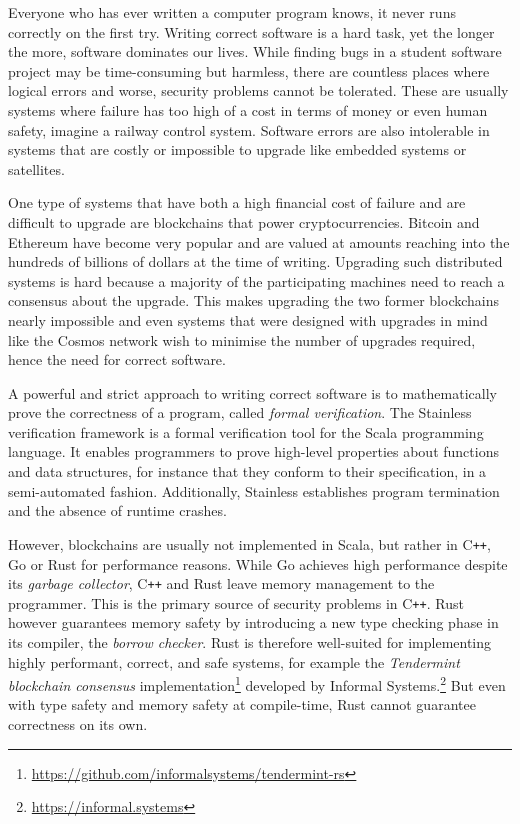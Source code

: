 Everyone who has ever written a computer program knows, it never runs correctly
on the first try. Writing correct software is a hard task, yet the longer the
more, software dominates our lives. While finding bugs in a student software
project may be time-consuming but harmless, there are countless places where
logical errors and worse, security problems cannot be tolerated. These are
usually systems where failure has too high of a cost in terms of money or even
human safety, imagine a railway control system. Software errors are also
intolerable in systems that are costly or impossible to upgrade like embedded
systems or satellites.

One type of systems that have both a high financial cost of failure and are
difficult to upgrade are blockchains that power cryptocurrencies. Bitcoin
\cite{bitcoin} and Ethereum \cite{ethereum} have become very popular and are
valued at amounts reaching into the hundreds of billions of dollars at the time
of writing. Upgrading such distributed systems is hard because a majority of the
participating machines need to reach a consensus about the upgrade. This makes
upgrading the two former blockchains nearly impossible and even systems that
were designed with upgrades in mind like the Cosmos network \cite{cosmos} wish
to minimise the number of upgrades required, hence the need for correct
software.

A powerful and strict approach to writing correct software is to mathematically
prove the correctness of a program, called \emph{formal verification}. The
Stainless verification framework \cite{stainless} is a formal verification tool
for the Scala programming language. It enables programmers to prove high-level
properties about functions and data structures, for instance that they conform
to their specification, in a semi-automated fashion. Additionally, Stainless
establishes program termination and the absence of runtime crashes.

However, blockchains are usually not implemented in Scala, but rather in
C\texttt{++}, Go or Rust for performance reasons. While Go achieves high
performance despite its \emph{garbage collector}, C\texttt{++} and Rust leave
memory management to the programmer. This is the primary source of security
problems in C\texttt{++}. Rust however guarantees memory safety by introducing a
new type checking phase in its compiler, the \emph{borrow checker}. Rust is
therefore well-suited for implementing highly performant, correct, and safe
systems, for example the \emph{Tendermint blockchain consensus}
implementation\footnote{\url{https://github.com/informalsystems/tendermint-rs}}
developed by Informal Systems.\footnote{\url{https://informal.systems}} But even
with type safety and memory safety at compile-time, Rust cannot guarantee
correctness on its own.

